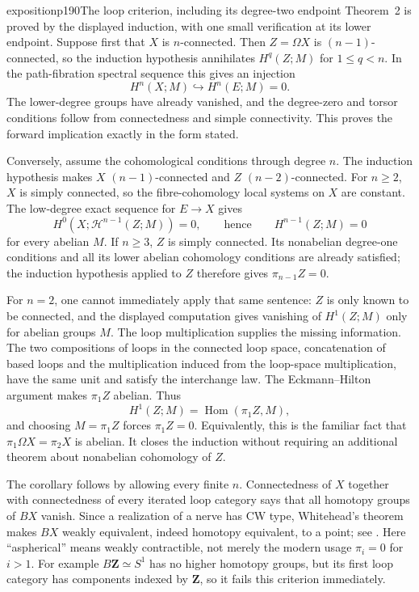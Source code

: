 \begin{dcomment}{exposition}{p190}{The loop criterion, including its degree-two endpoint}
Theorem~2 is proved by the displayed induction, with one small verification at its lower endpoint. Suppose first that $X$ is $n$-connected. Then $Z=\Omega X$ is $(n-1)$-connected, so the induction hypothesis annihilates $H^q(Z;M)$ for $1\leq q<n$. In the path-fibration spectral sequence this gives an injection
\[
 H^n(X;M)\hookrightarrow H^n(E;M)=0.
\]
The lower-degree groups have already vanished, and the degree-zero and torsor conditions follow from connectedness and simple connectivity. This proves the forward implication exactly in the form stated.

Conversely, assume the cohomological conditions through degree $n$. The induction hypothesis makes $X$ $(n-1)$-connected and $Z$ $(n-2)$-connected. For $n\geq2$, $X$ is simply connected, so the fibre-cohomology local systems on $X$ are constant. The low-degree exact sequence for $E\to X$ gives
\[
 H^0(X;\mathcal H^{n-1}(Z;M))=0,
 \qquad\text{hence}\qquad H^{n-1}(Z;M)=0
\]
for every abelian $M$. If $n\geq3$, $Z$ is simply connected. Its nonabelian degree-one conditions and all its lower abelian cohomology conditions are already satisfied; the induction hypothesis applied to $Z$ therefore gives $\pi_{n-1}Z=0$.

For $n=2$, one cannot immediately apply that same sentence: $Z$ is only known to be connected, and the displayed computation gives vanishing of $H^1(Z;M)$ only for abelian groups $M$. The loop multiplication supplies the missing information. The two compositions of loops in the connected loop space, concatenation of based loops and the multiplication induced from the loop-space multiplication, have the same unit and satisfy the interchange law. The Eckmann--Hilton argument makes $\pi_1Z$ abelian. Thus
\[
 H^1(Z;M)=\operatorname{Hom}(\pi_1Z,M),
\]
and choosing $M=\pi_1Z$ forces $\pi_1Z=0$. Equivalently, this is the familiar fact that $\pi_1\Omega X=\pi_2X$ is abelian. It closes the induction without requiring an additional theorem about nonabelian cohomology of $Z$.

The corollary follows by allowing every finite $n$. Connectedness of $X$ together with connectedness of every iterated loop category says that all homotopy groups of $BX$ vanish. Since a realization of a nerve has CW type, Whitehead's theorem makes $BX$ weakly equivalent, indeed homotopy equivalent, to a point; see \citet[Theorem~4.5]{Hatcher2002}. Here ``aspherical'' means weakly contractible, not merely the modern usage $\pi_i=0$ for $i>1$. For example $B\mathbf Z\simeq S^1$ has no higher homotopy groups, but its first loop category has components indexed by $\mathbf Z$, so it fails this criterion immediately.


\end{dcomment}
